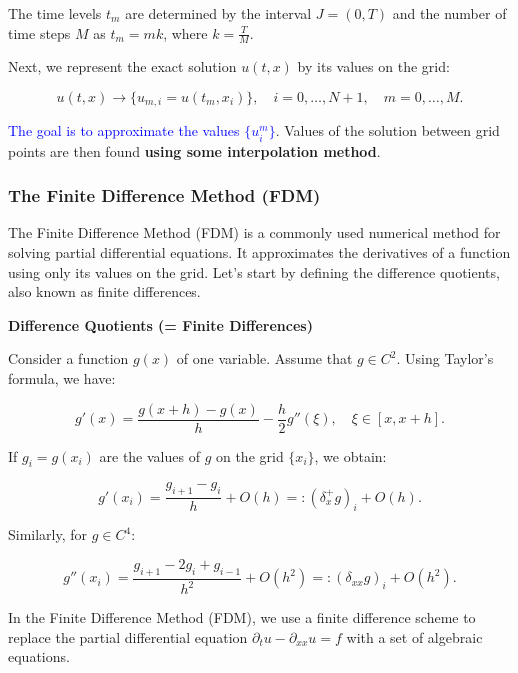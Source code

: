 The time levels $t_m$ are determined by the interval $J = (0, T)$ and the number of time steps $M$ as $t_m = mk$, where $k = \frac{T}{M}$.

\medskip

Next, we represent the exact solution $u(t, x)$ by its values on the grid:

\begin{equation*}
u(t, x) \rightarrow \{u_{m,i} = u(t_m, x_i)\}, \quad i = 0, \ldots, N+1, \quad m = 0, \ldots, M.
\end{equation*}

\textcolor{blue}{The goal is to approximate the values $\{u^{m}_{i}\}$}. Values of the solution between grid points are then found \textbf{using some interpolation method}.

\subsubsection{The Finite Difference Method (FDM)}

The Finite Difference Method (FDM) is a commonly used numerical method for solving partial differential equations. It approximates the derivatives of a function using only its values on the grid. Let's start by defining the difference quotients, also known as finite differences.

\textbf{Difference Quotients (= Finite Differences)}

Consider a function $g(x)$ of one variable. Assume that $g \in C^2$. Using Taylor's formula, we have:

\begin{equation*}
g' (x) = \frac{g(x + h) - g(x)}{h} - \frac{h}{2} g''(\xi), \quad \xi \in [x, x + h].
\end{equation*}

If $g_i = g(x_i)$ are the values of $g$ on the grid $\{x_i\}$, we obtain:

\begin{equation*}
g' (x_i) = \frac{g_{i+1} - g_i}{h} + O(h) =: {(\delta^{+}_{x} g)}_i + O(h).
\end{equation*}

Similarly, for $g \in C^4$:

\begin{equation*}
g'' (x_i) = \frac{g_{i+1} - 2g_i + g_{i-1}}{h^2} + O(h^2) =: {(\delta_{xx}g)}_i + O(h^2).
\end{equation*}


In the Finite Difference Method (FDM), we use a finite difference scheme to replace the partial differential equation $\partial_t u - \partial_{xx}u = f$ with a set of algebraic equations.

